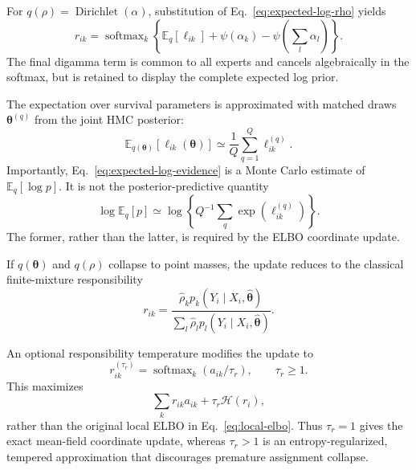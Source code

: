 For $q(\rho)=\operatorname{Dirichlet}(\alpha)$, substitution of
Eq.~\eqref{eq:expected-log-rho} yields
\begin{equation}
 r_{ik}=\operatorname{softmax}_k\!\left\{
 \mathbb E_q[\ell_{ik}]
 +\psi(\alpha_k)-\psi\!\left(\sum_l\alpha_l\right)
 \right\}.
\label{eq:dirichlet-responsibility}
\end{equation}
The final digamma term is common to all experts and cancels algebraically in
the softmax, but is retained to display the complete expected log prior.

The expectation over survival parameters is approximated with matched draws
$\boldsymbol\theta^{(q)}$ from the joint HMC posterior:
\begin{equation}
 \mathbb E_{q(\boldsymbol\theta)}
 [\ell_{ik}(\boldsymbol\theta)]
 \simeq\frac{1}{Q}\sum_{q=1}^{Q}\ell_{ik}^{(q)}.
\label{eq:expected-log-evidence}
\end{equation}
Importantly, Eq.~\eqref{eq:expected-log-evidence} is a Monte Carlo estimate of
$\mathbb E_q[\log p]$. It is not the posterior-predictive quantity
\begin{equation}
 \log\mathbb E_q[p]
 \simeq\log\left\{Q^{-1}\sum_q\exp(\ell_{ik}^{(q)})\right\}.
\end{equation}
The former, rather than the latter, is required by the ELBO coordinate update.

If $q(\boldsymbol\theta)$ and $q(\rho)$ collapse to point masses, the update
reduces to the classical finite-mixture responsibility
\begin{equation}
 r_{ik}
 =\frac{\widehat\rho_k
 p_k(Y_i\mid X_i,\widehat{\boldsymbol\theta})}
 {\sum_l\widehat\rho_l
 p_l(Y_i\mid X_i,\widehat{\boldsymbol\theta})}.
\end{equation}

An optional responsibility temperature modifies the update to
\begin{equation}
 r_{ik}^{(\tau_r)}=\operatorname{softmax}_k(a_{ik}/\tau_r),
 \qquad \tau_r\geq1.
\label{eq:tempered-responsibility}
\end{equation}
This maximizes
\begin{equation}
 \sum_k r_{ik}a_{ik}+\tau_r\mathcal H(r_i),
\end{equation}
rather than the original local ELBO in Eq.~\eqref{eq:local-elbo}. Thus
$\tau_r=1$ gives the exact mean-field coordinate update, whereas $\tau_r>1$
is an entropy-regularized, tempered approximation that discourages premature
assignment collapse.

